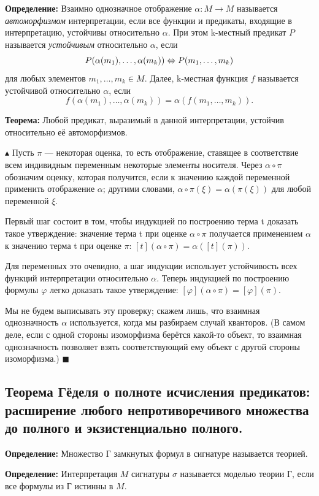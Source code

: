\textbf{Определение:} Взаимно однозначное отображение $\alpha: M \to M$ называется \textit{автоморфизмом} интерпретации, если все функции и предикаты, входящие в интерпретацию, устойчивы относительно $\alpha$. При этом k-местный предикат $P$ называется \textit{устойчивым} относительно $\alpha$, если 
\[P(\alpha(m_1), \ldots, \alpha(m_k)) \Leftrightarrow P(m_{1}, \ldots, m_{k})\]
для любых элементов $m_1, \ldots, m_k \in M$. Далее, k-местная функция $f$ называется устойчивой относительно $\alpha$, если
\[f(\alpha(m_{1}), \ldots, \alpha(m_{k})) = \alpha(f(m_{1}, \ldots, m_{k})).\]

\textbf{Теорема:} Любой предикат, выразимый в данной интерпретации, устойчив относительно её автоморфизмов.

$\blacktriangle$ Пусть $\pi$ — некоторая оценка, то есть отображение, ставящее в соответствие всем индивидным переменным некоторые элементы носителя. Через $\alpha \circ \pi$ обозначим оценку, которая получится, если к значению каждой переменной применить отображение $\alpha$; другими словами, $\alpha \circ \pi (\xi) = \alpha(\pi(\xi))$ для любой переменной $\xi$.

Первый шаг состоит в том, чтобы индукцией по построению терма t доказать такое утверждение: значение терма t при оценке $\alpha \circ \pi$ получается применением $\alpha$ к значению терма t при оценке $\pi$: $[t](\alpha \circ \pi) = \alpha([t](\pi))$.

Для переменных это очевидно, а шаг индукции использует устойчивость всех функций интерпретации относительно $\alpha$. Теперь индукцией по построению формулы $\varphi$ легко доказать такое утверждение: $[\varphi](\alpha \circ \pi) = [\varphi](\pi)$.

Мы не будем выписывать эту проверку; скажем лишь, что взаимная однозначность $\alpha$ используется, когда мы разбираем случай кванторов. (В самом деле, если с одной стороны изоморфизма берётся какой-то объект, то взаимная однозначность позволяет взять соответствующий ему объект с другой стороны изоморфизма.)
$\blacksquare$

\subsection{Теорема Гёделя о полноте исчисления предикатов: расширение любого непротиворечивого множества до полного и экзистенциально полного.}

\textbf{Определение:} Множество Г замкнутых формул в сигнатуре называется теорией.

\textbf{Определение:} Интерпретация $M$ сигнатуры $\sigma$ называется моделью теории Г, если все формулы из Г истинны в $M$.

